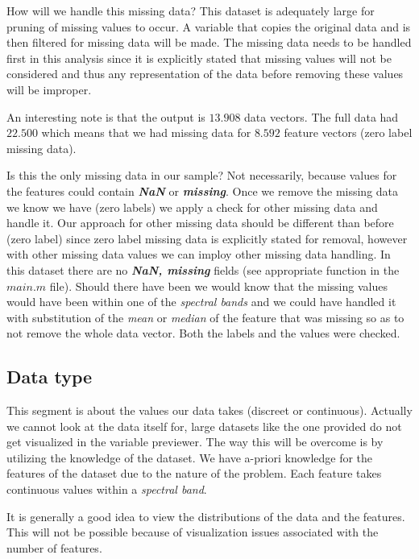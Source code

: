 \documentclass[12pt, a4paper]{article}
\begin{document}
How will we handle this missing data? This dataset is adequately large for pruning of missing values to occur. A variable that copies the original data and is then filtered for missing data will be made. The missing data needs to be handled first in this analysis since it is explicitly stated that missing values will not be considered and thus any representation of the data before removing these values will be improper.
\newline

An interesting note is that the output is $13.908$ data vectors. The full data had $22.500$ which means that we had missing data for $8.592$ feature vectors (zero label missing data).
\newline

Is this the only missing data in our sample? Not necessarily, because values for the features could contain \textbf{\textit{NaN}} or \textbf{\textit{missing}}. Once we remove the missing data we know we have (zero labels) we apply a check for other missing data and handle it. Our approach for other missing data should be different than before (zero label) since zero label missing data is explicitly stated for removal, however with other missing data values we can imploy other missing data handling. In this dataset there are no \textbf{\textit{NaN, missing}} fields (see appropriate function in the $main.m$ file). Should there have been we would know that the missing values would have been within one of the \textit{spectral bands} and we could have handled it with substitution of the \textit{mean} or \textit{median} of the feature that was missing so as to not remove the whole data vector. Both the labels and the values were checked.

\subsection{Data type}

This segment is about the values our data takes (discreet or continuous). Actually we cannot look at the data itself for, large datasets like the one provided do not get visualized in the variable previewer. The way this will be overcome is by utilizing the knowledge of the dataset. We have a-priori knowledge for the features of the dataset due to the nature of the problem. Each feature takes continuous values within a \textit{spectral band}.
\newline

It is generally a good idea to view the distributions of the data and the features. This will not be possible because of visualization issues associated with the number of features.
\newline
\end{document}
